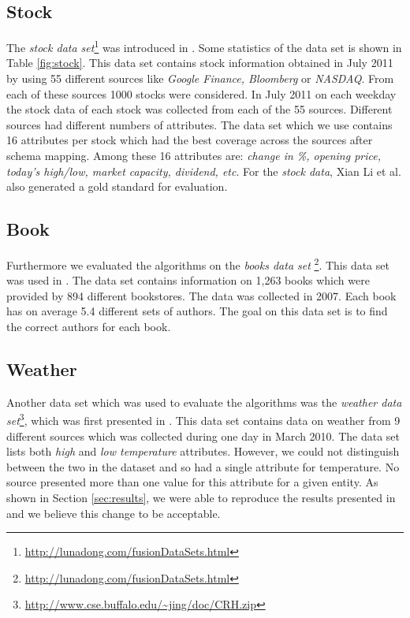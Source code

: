 \documentclass{acm_proc_article-sp}
\begin{document}
\subsection{Stock}

The \emph{stock data set}\footnote{\url{http://lunadong.com/fusionDataSets.html}} was introduced in \cite{li:truth}. Some statistics of the data set is shown in Table \ref{fig:stock}. This data set contains stock information obtained in July 2011 by using 55 different sources like \emph{Google Finance, Bloomberg} or \emph{NASDAQ}. From each of these sources 1000 stocks were considered. In July 2011 on each weekday the stock data of each stock was collected from each of the 55 sources. Different sources had different numbers of attributes. The data set which we use contains 16 attributes per stock which had the best coverage across the sources after schema mapping. Among these 16 attributes are: \emph{change in \%, opening price, today's high/low, market capacity, dividend, etc}. For the \emph{stock data}, {Xian Li et al.} \cite{li:truth} also generated a gold standard for evaluation.

\subsection{Book}

Furthermore we evaluated the algorithms on the \emph{books data set} \footnote{\url{http://lunadong.com/fusionDataSets.html}}. This data set was used in \cite{yin:truth}. The data set contains information on 1,263 books which were provided by 894 different bookstores. The data was collected in 2007. Each book has on average 5.4 different sets of authors. The goal on this data set is to find the correct authors for each book.

\subsection{Weather}

Another data set which was used to evaluate the algorithms was the \emph{weather data set}\footnote{\url{http://www.cse.buffalo.edu/~jing/doc/CRH.zip}}, which was first presented in \cite{li:resolving}. This data set contains data on weather from 9 different sources which was collected during one day in March 2010. The data set lists both \emph{high} and \emph{low temperature} attributes. However, we could not distinguish between the two in the dataset and so had a single attribute for temperature. No source presented more than one value for this attribute for a given entity. As shown in Section \ref{sec:results}, we were able to reproduce the results presented in \cite{li:resolving} and we believe this change to be acceptable. 
\end{document}
